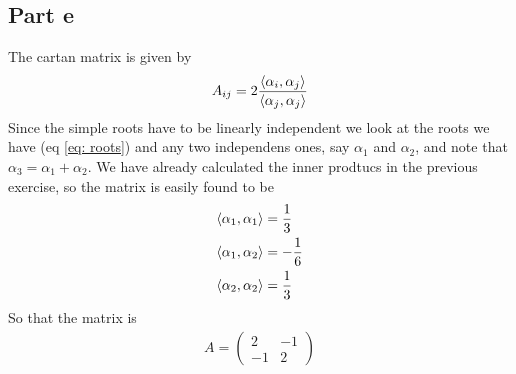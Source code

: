 \documentclass[a4paper,12pt]{article}
\begin{document}
\subsection*{Part e}
The cartan matrix is given by
\begin{equation}
	\begin{aligned}
		A_{ij}=2\frac{\expval{\alpha_i,\alpha_j}}{\expval{\alpha_j,\alpha_j}}
	\end{aligned}
\end{equation}
Since the simple roots have to be linearly independent we look at the roots we have (eq \eqref{eq: roots}) and any two independens ones, say
 $\alpha_1$ and $\alpha_2$, and note that $\alpha_3=\alpha_1+\alpha_2$. We have already calculated the inner prodtucs in the previous exercise, so the matrix is easily found to be
\begin{equation}
	\begin{aligned}
		\expval{\alpha_1,\alpha_1}&=\frac{1}{3}\\
		\expval{\alpha_1,\alpha_2}&=-\frac{1}{6}\\
		\expval{\alpha_2,\alpha_2}&=\frac{1}{3}\\
	\end{aligned}
\end{equation}
So that the matrix is
\begin{equation}
	\begin{aligned}
		A=\begin{pmatrix}
			2 & -1 \\
			-1 & 2
		\end{pmatrix}
	\end{aligned}
\end{equation}
\end{document}

